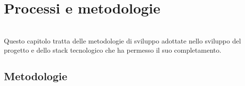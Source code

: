 
\chapter{Processi e metodologie}
\label{cap:processi-metodologie}

\\
Questo capitolo tratta delle metodologie di sviluppo adottate nello sviluppo del progetto e dello stack tecnologico che ha permesso il suo completamento.

\section{Metodologie}

